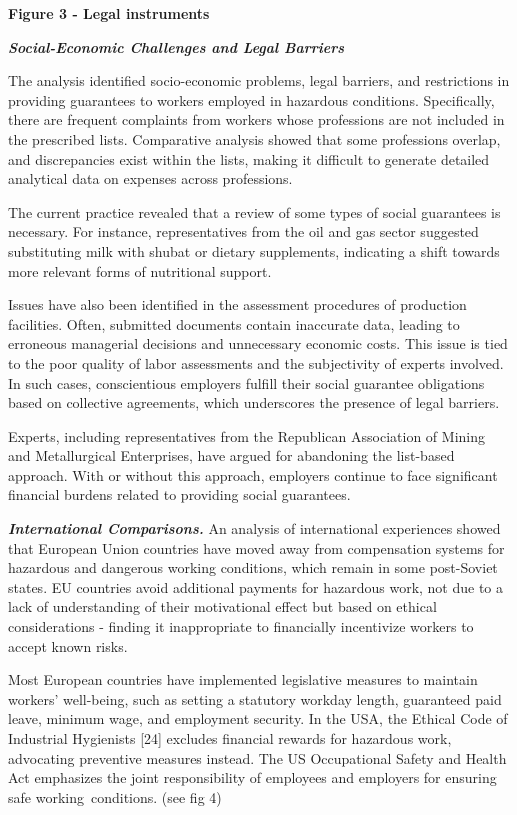 {\bfseries Figure 3 - Legal instruments}

\emph{{\bfseries Social-Economic Challenges and Legal Barriers}}

The analysis identified socio-economic problems, legal barriers, and
restrictions in providing guarantees to workers employed in hazardous
conditions. Specifically, there are frequent complaints from workers
whose professions are not included in the prescribed lists. Comparative
analysis showed that some professions overlap, and discrepancies exist
within the lists, making it difficult to generate detailed analytical
data on expenses across professions.

The current practice revealed that a review of some types of social
guarantees is necessary. For instance, representatives from the oil and
gas sector suggested substituting milk with shubat or dietary
supplements, indicating a shift towards more relevant forms of
nutritional support.

Issues have also been identified in the assessment procedures of
production facilities. Often, submitted documents contain inaccurate
data, leading to erroneous managerial decisions and unnecessary economic
costs. This issue is tied to the poor quality of labor assessments and
the subjectivity of experts involved. In such cases, conscientious
employers fulfill their social guarantee obligations based on collective
agreements, which underscores the presence of legal barriers.

Experts, including representatives from the Republican Association of
Mining and Metallurgical Enterprises, have argued for abandoning the
list-based approach. With or without this approach, employers continue
to face significant financial burdens related to providing social
guarantees.

\emph{{\bfseries International Comparisons.}} An analysis of international
experiences showed that European Union countries have moved away from
compensation systems for hazardous and dangerous working conditions,
which remain in some post-Soviet states. EU countries avoid additional
payments for hazardous work, not due to a lack of understanding of their
motivational effect but based on ethical considerations - finding it
inappropriate to financially incentivize workers to accept known risks.

Most European countries have implemented legislative measures to
maintain workers'{} well-being, such as setting a
statutory workday length, guaranteed paid leave, minimum wage, and
employment security. In the USA, the Ethical Code of Industrial
Hygienists {[}24{]} excludes financial rewards for hazardous work,
advocating preventive measures instead. The US Occupational Safety and
Health Act emphasizes the joint responsibility of employees and
employers for ensuring safe working~conditions. (see fig 4)

